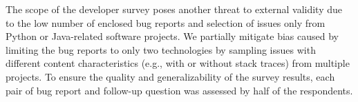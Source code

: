 The scope of the developer survey poses another threat to external validity due to the low number of enclosed bug reports and selection of issues only from Python or Java-related software projects. We partially mitigate bias caused by limiting the bug reports to only two technologies by sampling issues with different content characteristics (e.g., with or without stack traces) from multiple projects.  To ensure the quality and generalizability of the survey results, each pair of bug report and follow-up question was assessed by half of the respondents.
